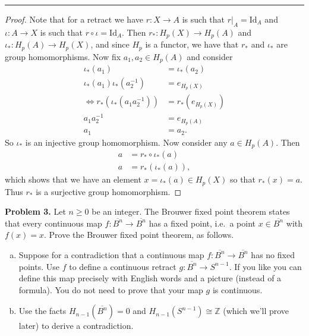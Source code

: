 \documentclass[leqno]{article}
\theoremstyle{nonumberplain}
\newtheorem{proof}{Proof}
\newcommand{\Z}{\ensuremath{\mathbb{Z}}}
\newcommand{\Id}{\ensuremath{\mathrm{Id}}}
\begin{document}
\noindent\rule[0.5ex]{\linewidth}{1pt}

\begin{proof}
Note that for a retract we have $r\colon X \to A$ is such that $r\vert_A = \Id_A$ and $\iota \colon A \to X$ is such that $r\circ \iota = \Id_A$. Then $r_* \colon H_p(X)\to H_p(A)$ and $\iota_* \colon H_p(A)\to H_p(X)$, and since $H_p$ is a functor, we have that $r_*$ and $\iota_*$ are group homomorphisms.  Now fix $a_1,a_2 \in H_p(A)$ and consider
\begin{align*}
\iota_* (a_1) &= \iota_* (a_2)\\
 \iota_* (a_1) \iota_*(a_2^{-1})&=e_{H_p(X)}\\
\iff r_* (\iota_* (a_1 a_2^{-1}))&=r_* (e_{H_p(X)})\\
a_1 a_2^{-1}&=e_{H_p(A)}\\
a_1&=a_2.
\end{align*}
So $\iota_*$ is an injective group homomorphism. Now consider any $a\in H_p(A)$. Then
\begin{align*}
a&=r_*\circ \iota_* (a)\\
a&=r_* (\iota_*(a)),
\end{align*}
which shows that we have an element $x=\iota_*(a)\in H_p(X)$ so that $r_*(x)=a$. Thus $r_*$ is a surjective group homomorphism.
\end{proof}


\pagebreak




\noindent\textbf{Problem 3.}  Let $n\ge 0$ be an integer. The Brouwer fixed point theorem states that every continuous map $f\colon\overline{B^n}\to\overline{B^n}$ has a fixed point, i.e.\ a point $x\in \overline{B^n}$ with $f(x)=x$. Prove the Brouwer fixed point theorem, as follows.
\begin{enumerate}[(a)]
\item Suppose for a contradiction that a continuous map $f\colon\overline{B^n}\to\overline{B^n}$ has no fixed points. Use $f$ to define a continuous retract $g\colon \overline{B^n}\to S^{n-1}$. If you like you can define this map precisely with English words and a picture (instead of a formula). You do not need to prove that your map $g$ is continuous.
\item Use the facts $H_{n-1}(\overline{B^n})=0$ and $H_{n-1}(S^{n-1})\cong \Z$ (which we'll prove later) to derive a contradiction.
\end{enumerate}
\end{document}
